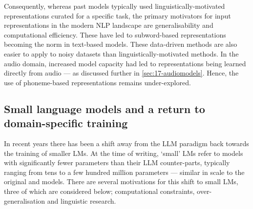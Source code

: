 

Consequently, whereas past models typically used linguistically-motivated representations curated for a specific task, the primary motivators for input representations in the modern NLP landscape are generalisability and computational efficiency. These have led to subword-based representations becoming the norm in text-based models. These data-driven methods are also easier to apply to noisy datasets than linguistically-motivated methods. In the audio domain, increased model capacity had led to representations being learned directly from audio --- as discussed further in \cref{sec:17-audiomodels}. Hence, the use of phoneme-based representations remains under-explored. 


\subsection{Small language models and a return to domain-specific training}\label{sec:12-domainspecific}

In recent years there has been a shift away from the LLM paradigm back towards the training of smaller LMs. At the time of writing, `small' LMs  refer to models with significantly fewer parameters than their LLM counter-parts, typically ranging from tens to a few hundred million parameters --- similar in scale to the original \bert and  models. There are several motivations for this shift to small LMs, three of which are considered below; computational constraints, over-generalisation and linguistic research.

